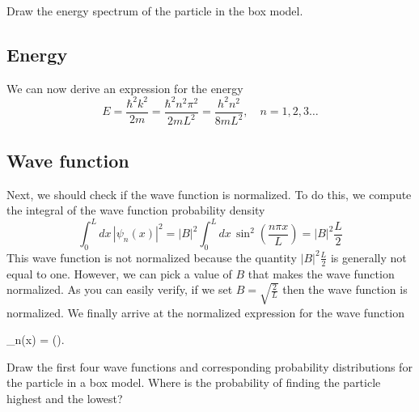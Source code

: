 \documentclass[../Main/chem331-notes.tex]{subfiles}
\begin{document}
\begin{exercise}
Draw the energy spectrum of the particle in the box model.
\end{exercise}

\subsection{Energy}
We can now derive an expression for the energy
\begin{equation}
E = \frac{\hbar^2 k^2}{2m} = \frac{\hbar^2 n^2 \pi^2}{2m L^2} = \frac{h^2 n^2 }{8 m L^2}, \quad n = 1,2,3\ldots
\end{equation}

\subsection{Wave function}
Next, we should check if the wave function is normalized.
To do this, we compute the integral of the wave function probability density
\begin{equation}
\int_0^L dx\,|\psi_{n}(x)|^2 = |B|^2 \int_0^L dx\,\sin^2\left(\frac{n \pi x}{L}\right)
=  |B|^2 \frac{L}{2}
\end{equation}
This wave function is not normalized because the quantity $|B|^2 \frac{L}{2}$ is generally not equal to one.
However, we can pick a value of $B$ that makes the wave function normalized.
As you can easily verify, if we set $B = \sqrt{\frac{2}{L}}$ then the wave function is normalized.
We finally arrive at the normalized expression for the wave function
\begin{iequation}
\psi_{n}(x) =  \sin\left(\right).
\end{iequation}
\begin{exercise}
Draw the first four wave functions and corresponding probability distributions for the particle in a box model.
Where is the probability of finding the particle highest and the lowest?
\end{exercise}
\end{document}
